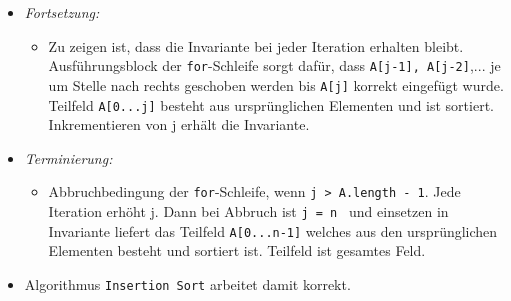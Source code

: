 \documentclass[
    12pt,
    a4paper,
    ngerman,
    color=3b,%
    marginpar=false,
    colorback=false,
    leqno,
]{tudaexercise}
\begin{document}
\begin{itemize}
\begin{itemize}
              \item \textit{Fortsetzung:}
                    \begin{itemize}
                        \item   Zu zeigen ist, dass die Invariante bei jeder Iteration erhalten bleibt. Ausführungsblock der \texttt{for}-Schleife
                              sorgt dafür, dass \texttt{A[j-1], A[j-2]},... je um Stelle nach rechts geschoben werden bis \texttt{A[j]} korrekt eingefügt wurde.
                              Teilfeld \texttt{A[0...j]} besteht aus ursprünglichen Elementen und ist sortiert. Inkrementieren von j erhält die Invariante.
                    \end{itemize}

              \item \textit{Terminierung: }
                    \begin{itemize}
                        \item   Abbruchbedingung der \texttt{for}-Schleife, wenn \texttt{j > A.length - 1}. Jede Iteration erhöht j.
                              Dann bei Abbruch ist \texttt{j = n } und einsetzen in Invariante liefert das Teilfeld \texttt{A[0...n-1]}
                              welches aus den ursprünglichen Elementen besteht und sortiert ist. Teilfeld ist gesamtes Feld.
                    \end{itemize}

              \item Algorithmus \texttt{Insertion Sort} arbeitet damit korrekt.


\end{itemize}
\end{itemize}
\end{document}
